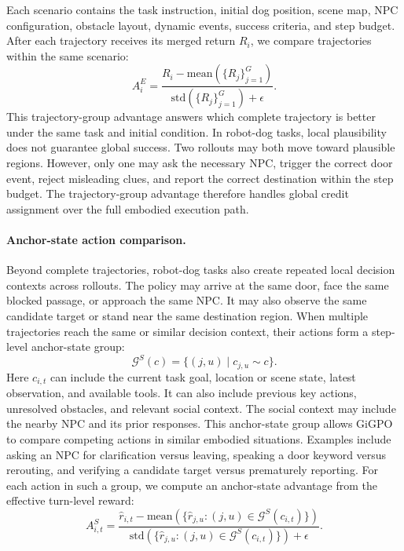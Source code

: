 Each scenario contains the task instruction, initial dog position, scene map, NPC configuration, obstacle layout, dynamic events, success criteria, and step budget. After each trajectory receives its merged return $R_i$, we compare trajectories within the same scenario:
\begin{equation}
A_i^{E}
=
\frac{
R_i-\mathrm{mean}(\{R_j\}_{j=1}^{G})
}{
\mathrm{std}(\{R_j\}_{j=1}^{G})+\epsilon
}.
\end{equation}
This trajectory-group advantage answers which complete trajectory is better under the same task and initial condition. In robot-dog tasks, local plausibility does not guarantee global success. Two rollouts may both move toward plausible regions. However, only one may ask the necessary NPC, trigger the correct door event, reject misleading clues, and report the correct destination within the step budget. The trajectory-group advantage therefore handles global credit assignment over the full embodied execution path.

\paragraph{Anchor-state action comparison.}
Beyond complete trajectories, robot-dog tasks also create repeated local decision contexts across rollouts. The policy may arrive at the same door, face the same blocked passage, or approach the same NPC. It may also observe the same candidate target or stand near the same destination region. When multiple trajectories reach the same or similar decision context, their actions form a step-level anchor-state group:
\begin{equation}
\mathcal{G}^{S}(c)
=
\{(j,u)\mid c_{j,u}\sim c\}.
\end{equation}
Here $c_{i,t}$ can include the current task goal, location or scene state, latest observation, and available tools. It can also include previous key actions, unresolved obstacles, and relevant social context. The social context may include the nearby NPC and its prior responses. This anchor-state group allows GiGPO to compare competing actions in similar embodied situations. Examples include asking an NPC for clarification versus leaving, speaking a door keyword versus rerouting, and verifying a candidate target versus prematurely reporting. For each action in such a group, we compute an anchor-state advantage from the effective turn-level reward:
\begin{equation}
A_{i,t}^{S}
=
\frac{
\hat r_{i,t}
-
\mathrm{mean}(\{\hat r_{j,u}:(j,u)\in \mathcal{G}^{S}(c_{i,t})\})
}{
\mathrm{std}(\{\hat r_{j,u}:(j,u)\in \mathcal{G}^{S}(c_{i,t})\})+\epsilon
}.
\end{equation}

